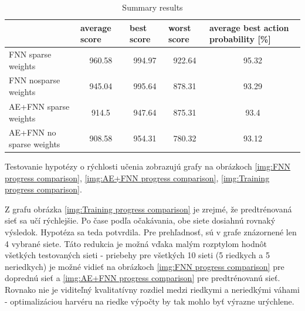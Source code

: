 \documentclass[10pt,a4paper]{article}
\begin{document}
\begin{table}[]
\centering
\caption{Summary results}
\label{tab:summary_results}
\begin{tabular}{|l|c|c|c|c|}
\hline
                         & \multicolumn{1}{l|}{average score} & \multicolumn{1}{l|}{best score} & \multicolumn{1}{l|}{worst score} & \multicolumn{1}{l|}{average best action probability {[}\%{]}} \\ \hline
FNN sparse weights       & 960.58                             & 994.97                          & 922.64                           & 95.32                                                         \\ \hline
FNN nosparse weights     & 945.04                             & 995.64                          & 878.31                           & 93.29                                                         \\ \hline
AE+FNN sparse weights    & 914.5                              & 947.64                          & 875.31                           & 93.4                                                          \\ \hline
AE+FNN no sparse weights & 908.58                             & 954.31                          & 780.32                           & 93.12                                                         \\ \hline
\end{tabular}
\end{table}

Testovanie hypotézy o rýchlosti učenia zobrazujú grafy na obrázkoch
\ref{img:FNN progress comparison}, \ref{img:AE+FNN progress comparison}, \ref{img:Training progress comparison}.

Z grafu obrázka \ref{img:Training progress comparison} je zrejmé, že predtrénovaná
sieť sa učí rýchlejšie. Po čase podľa očakávania, obe siete dosiahnú rovnaký výsledok.
Hypotéza sa teda potvrdila. Pre prehľadnosť, sú v grafe znázornené len 4 vybrané siete.
Táto redukcia je možná vďaka malým rozptylom hodnôt všetkých testovaných sieti - priebehy
pre všetkých 10 sieti (5 riedkych a 5 neriedkych) je možné vidieť na obrázkoch \ref{img:FNN progress comparison} pre doprednú sieť
a \ref{img:AE+FNN progress comparison} pre predtrénovanú sieť.
Rovnako nie je viditeľný kvalitatívny rozdiel medzi riedkymi a neriedkými váhami - optimalizáciou
harvéru na riedke výpočty by tak mohlo byť výrazne urýchlene.
\end{document}
